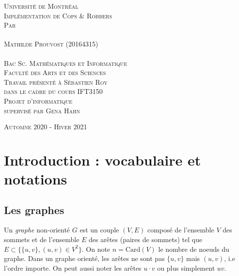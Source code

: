 \documentclass[12pt]{article}
\newcommand{\card}[1]{\text{Card}(#1)}
\newcommand{\cp}{Cops \& Robbers\xspace}
\begin{document}
\begin{titlepage}
\begin{center}

\textsc{\Large Université de Montréal}\\[4cm]
%
\textsc{\LARGE Implémentation de Cops \& Robbers}\\[4cm]
%
\textsc{\Large Par}\\
\textsc{\Large }\\
\textsc{\Large Mathilde Prouvost (20164315)}\\
\textsc{\Large }\\[3cm]
%
\textsc{\Large Bac Sc. Mathématiques et Informatique}\\
\textsc{\Large Faculté des Arts et des Sciences}\\[3.5cm]

\textsc{\Large Travail présenté à Sébastien Roy}\\
\textsc{\Large dans le cadre du cours IFT3150}\\
\textsc{\Large Projet d'informatique}\\
\textsc{\Large supervisé par Gena Hahn}

\vfill

\textsc{\large Automne 2020 - Hiver 2021}

\end{center}
\end{titlepage}

\begin{abstract}

Le problème de \cp consiste à trouver le nombre minimal de policiers nécessaire pour attraper un voleur se déplaçant sur un graphe. 
Alors qu'originalement le projet consistait en de la recherche sur ce problème, le but de ce projet est finalement d'implémenter une application permettant de visualiser le problème. L'application devra permettre de dessiner un graphe, de le modifier, de positionner des policiers et un voleur et de les faire se déplacer selon les règles.

\end{abstract}

\section{Introduction : vocabulaire et notations}

\subsection{Les graphes}
Un \emph{graphe} non-orienté $G$ est un couple $(V,E)$ composé de l'ensemble $V$ des sommets et de l'ensemble $E$ des arêtes (paires de sommets) tel que $E \subset \{\{u,v\}, (u,v)\in V^2\}$. On note $n=\card{V}$ le nombre de noeuds du graphe. Dans un graphe orienté, les arêtes ne sont pas $\{u,v\}$ mais $(u,v)$, i.e l'ordre importe. On peut aussi noter les arêtes $u \cdot v$ ou plus simplement $uv$.
\end{document}
